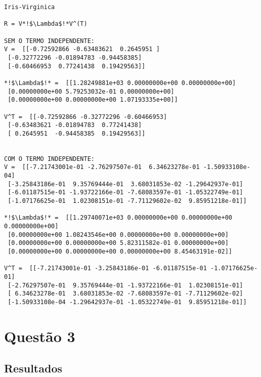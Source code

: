\documentclass[a4paper,12pt,twoside]{article}
\begin{document}
\begin{lstlisting}
Iris-Virginica

R = V*!$\Lambda$!*V^(T)

SEM O TERMO INDEPENDENTE: 
V =  [[-0.72592866 -0.63483621  0.2645951 ]
 [-0.32772296 -0.01894783 -0.94458385]
 [-0.60466953  0.77241438  0.19429563]]

*!$\Lambda$!* =  [[1.28249881e+03 0.00000000e+00 0.00000000e+00]
 [0.00000000e+00 5.79253032e-01 0.00000000e+00]
 [0.00000000e+00 0.00000000e+00 1.07193335e+00]]

V^T =  [[-0.72592866 -0.32772296 -0.60466953]
 [-0.63483621 -0.01894783  0.77241438]
 [ 0.2645951  -0.94458385  0.19429563]]


COM O TERMO INDEPENDENTE: 
V =  [[-7.21743001e-01 -2.76297507e-01  6.34623278e-01 -1.50933108e-04]
 [-3.25843186e-01  9.35769444e-01  3.68031853e-02 -1.29642937e-01]
 [-6.01187515e-01 -1.93722166e-01 -7.68083597e-01 -1.05322749e-01]
 [-1.07176625e-01  1.02308151e-01 -7.71129602e-02  9.85951218e-01]]

*!$\Lambda$!* =  [[1.29740071e+03 0.00000000e+00 0.00000000e+00 0.00000000e+00]
 [0.00000000e+00 1.08243546e+00 0.00000000e+00 0.00000000e+00]
 [0.00000000e+00 0.00000000e+00 5.82311582e-01 0.00000000e+00]
 [0.00000000e+00 0.00000000e+00 0.00000000e+00 8.45463191e-02]]

V^T =  [[-7.21743001e-01 -3.25843186e-01 -6.01187515e-01 -1.07176625e-01]
 [-2.76297507e-01  9.35769444e-01 -1.93722166e-01  1.02308151e-01]
 [ 6.34623278e-01  3.68031853e-02 -7.68083597e-01 -7.71129602e-02]
 [-1.50933108e-04 -1.29642937e-01 -1.05322749e-01  9.85951218e-01]]
\end{lstlisting}

\section{Questão 3}
\subsection{Resultados}
\end{document}

